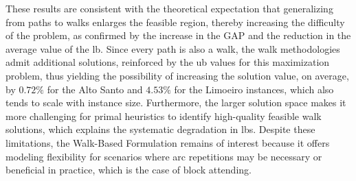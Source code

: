 These results are consistent with the theoretical expectation that generalizing from paths to walks enlarges the feasible region, thereby increasing the difficulty of the problem, as confirmed by the increase in the GAP and the reduction in the average value of the \gls{lb}.
Since every path is also a walk, the walk methodologies admit additional solutions, reinforced by the \gls{ub} values for this maximization problem, thus yielding the possibility of increasing the solution value, on average, by $0.72\%$ for the Alto Santo and $4.53\%$ for the Limoeiro instances, which also tends to scale with instance size.
Furthermore, the larger solution space makes it more challenging for primal heuristics to identify high-quality feasible walk solutions, which explains the systematic degradation in \gls{lb}s.
Despite these limitations, the Walk-Based Formulation remains of interest because it offers modeling flexibility for scenarios where arc repetitions may be necessary or beneficial in practice, which is the case of block attending.